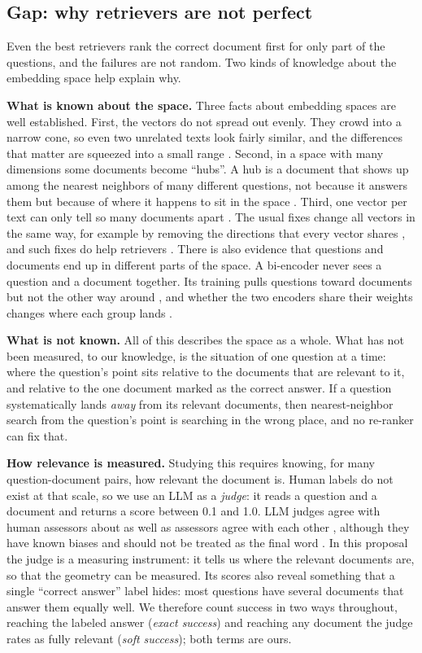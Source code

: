 \documentclass[12pt,a4paper]{article}
\begin{document}
\subsection{Gap: why retrievers are not perfect}

Even the best retrievers rank the correct document first for only part of the questions, and the failures are not random. Two kinds of knowledge about the embedding space help explain why.

\textbf{What is known about the space.} Three facts about embedding spaces are well established. First, the vectors do not spread out evenly. They crowd into a narrow cone, so even two unrelated texts look fairly similar, and the differences that matter are squeezed into a small range \citep{ethayarajh2019contextual}. Second, in a space with many dimensions some documents become ``hubs''. A hub is a document that shows up among the nearest neighbors of many different questions, not because it answers them but because of where it happens to sit in the space \citep{radovanovic2010hubs}. Third, one vector per text can only tell so many documents apart \citep{luan2021sparse}. The usual fixes change all vectors in the same way, for example by removing the directions that every vector shares \citep{mu2018allbutthetop}, and such fixes do help retrievers \citep{jung2023isotropic}. There is also evidence that questions and documents end up in different parts of the space. A bi-encoder never sees a question and a document together. Its training pulls questions toward documents but not the other way around \citep{li2021dance}, and whether the two encoders share their weights changes where each group lands \citep{dong2022dualencoder}.

\textbf{What is not known.} All of this describes the space as a whole. What has not been measured, to our knowledge, is the situation of one question at a time: where the question's point sits relative to the documents that are relevant to it, and relative to the one document marked as the correct answer. If a question systematically lands \emph{away} from its relevant documents, then nearest-neighbor search from the question's point is searching in the wrong place, and no re-ranker can fix that.

\textbf{How relevance is measured.} Studying this requires knowing, for many question-document pairs, how relevant the document is. Human labels do not exist at that scale, so we use an LLM as a \emph{judge}: it reads a question and a document and returns a score between 0.1 and 1.0. LLM judges agree with human assessors about as well as assessors agree with each other \citep{thomas2024llmjudge,upadhyay2024umbrela}, although they have known biases and should not be treated as the final word \citep{soboroff2024cantreplace}. In this proposal the judge is a measuring instrument: it tells us where the relevant documents are, so that the geometry can be measured. Its scores also reveal something that a single ``correct answer'' label hides: most questions have several documents that answer them equally well. We therefore count success in two ways throughout, reaching the labeled answer (\emph{exact success}) and reaching any document the judge rates as fully relevant (\emph{soft success}); both terms are ours.
\end{document}
